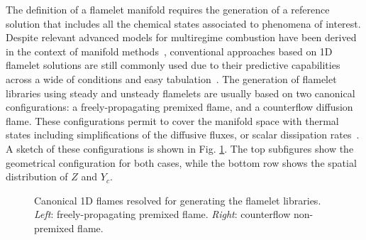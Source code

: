 \documentclass[preprint,12pt,authoryear]{elsarticle}
\begin{document}

The definition of a flamelet manifold requires the generation of a reference solution that includes all the chemical states associated to phenomena of interest. Despite relevant advanced models for multiregime combustion have been derived in the context of manifold methods~\citep{scholtissek_multi-scale_2015,scholtissek_derivation_2020,mueller_physically-derived_2020}, conventional approaches based on 1D flamelet solutions are still commonly used due to their predictive capabilities across a wide of conditions and easy tabulation~\citep{kalbhor_investigation_2024,an_extended_2024}. The generation of flamelet libraries using steady and unsteady flamelets are usually based on two canonical configurations: a freely-propagating premixed flame, and a counterflow diffusion flame. These configurations permit to cover the manifold space with thermal states including simplifications of the diffusive fluxes, or scalar dissipation rates~\citep{mueller_physically-derived_2020}. A sketch of these configurations is shown in Fig. \ref{fig:flames_1D_sketch}. The top subfigures show the geometrical configuration for both cases, while the bottom row shows the spatial distribution of $Z$ and $Y_c$. 

\begin{figure}[h!]
	\centering
	\caption{Canonical 1D flames resolved for generating the flamelet libraries. \textsl{Left}: freely-propagating premixed flame. \textsl{Right}: counterflow non-premixed flame. }
	\label{fig:flames_1D_sketch}
\end{figure}


\end{document}
